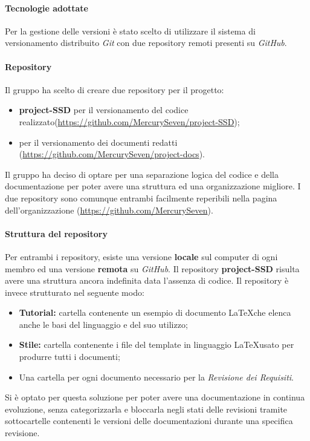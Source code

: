 \paragraph{Tecnologie adottate}
Per la gestione delle versioni è stato scelto di utilizzare il sistema di versionamento distribuito \textit{Git} con due repository remoti presenti su \textit{GitHub}.
\paragraph{Repository}
Il gruppo \textit{\Gruppo{}} ha scelto di creare due repository per il progetto:
\begin{itemize}
	\item \textbf{project-SSD} per il versionamento del codice realizzato(\url{https://github.com/MercurySeven/project-SSD});
	\item \textbf{\repoDoc{}} per il versionamento dei documenti redatti (\url{https://github.com/MercurySeven/project-docs}).
\end{itemize}
Il gruppo ha deciso di optare per una separazione logica del codice e della documentazione per poter avere una struttura ed una organizzazione migliore. I due repository sono comunque entrambi facilmente reperibili nella pagina dell'organizzazione (\url{https://github.com/MercurySeven}).
\paragraph{Struttura del repository}
Per entrambi i repository, esiste una versione \textbf{locale} sul computer di ogni membro ed una versione \textbf{remota} su \textit{GitHub}.\newline
Il repository \textbf{project-SSD} risulta avere una struttura ancora indefinita data l'assenza di codice.\newline
Il repository \textbf{\repoDoc{}} è invece strutturato nel seguente modo:
\begin{itemize}
	\item \textbf{Tutorial:} cartella contenente un esempio di documento \LaTeX che elenca anche le basi del linguaggio e del suo utilizzo; 
	\item \textbf{Stile:} cartella contenente i file del template in linguaggio \LaTeX usato per produrre tutti i documenti;
	\item Una cartella per ogni documento necessario per la \textit{Revisione dei Requisiti}.
\end{itemize}
Si è optato per questa soluzione per poter avere una documentazione in continua evoluzione, senza categorizzarla e bloccarla negli stati delle revisioni tramite sottocartelle contenenti le versioni delle documentazioni durante una specifica revisione.
